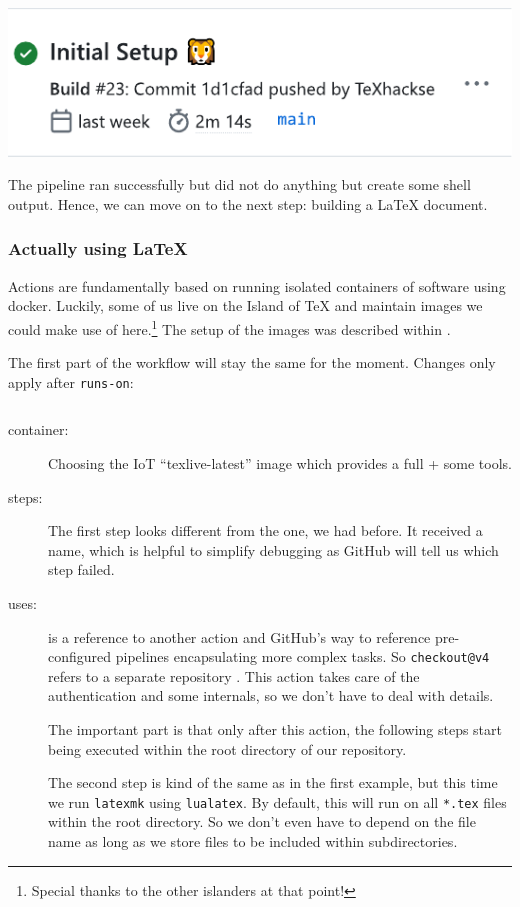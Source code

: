 \documentclass[final]{ltugboat}
\newcommand*{\TeXLive}{\acro{\TeX\,Live}\xspace}
\newcommand*{\action}[1]{\texttt{#1}}
\newcommand*{\command}[1]{\texttt{#1}}
\newcommand*{\file}[1]{\texttt{#1}}
\newcommand*{\containerimage}[1]{\enquote{#1}}
\begin{document}
\noindent\includegraphics[width=\linewidth,alt={Cropping of a Screenshot from the GitHub Actions status page of a repository. The run was successful. The commit was von bei @TeXhackse and the commit message says  “Initial setup” followed by a lion emojy.}]{screenshot-pipeline-successful}

The pipeline ran successfully but did not do anything but create some shell output.
Hence, we can move on to the next step: building a \LaTeX{} document.

\subsubsection{Actually using \LaTeX}

Actions are fundamentally based on running isolated containers of software using docker.
Luckily, some of us live on the Island of \TeX{} and maintain images we could make use of here.\footnote{Special thanks to the other islanders at that point!}
The setup of the images was described within \cite{islandoftex-docker-short}.

The first part of the workflow will stay the same for the moment.
Changes only apply after \texttt{runs-on}:

\inputminted[firstline=5, lastline=12,gobble=3]{yaml}{examples/latex-basic.yml}


\begin{description}
\item[container:] Choosing the IoT \containerimage{texlive-latest} image which provides a full \TeXLive + some tools\cite{islandoftex-docker}.
\item[steps:]
The first step looks different from the one, we had before.
It received a name, which is helpful to simplify debugging as GitHub will tell us which step failed.

\item[uses:] is a reference to another action and GitHub's way to reference pre-configured pipelines encapsulating more complex tasks.
So \action{checkout@v4} refers to a separate repository \cite{github-action-checkout}.
This action takes care of the authentication and some internals, so we don't have to deal with details.

The important part is that only after this action, the following steps start being executed within the root directory of our repository.

The second step is kind of the same as in the first example, but this time we run \command{latexmk}\cite{latexmk} using \command{lualatex}.
By default, this will run on all \file{*.tex} files within the root directory.
So we don't even have to depend on the file name as long as we store files to be included within subdirectories.
\end{description}
\end{document}
